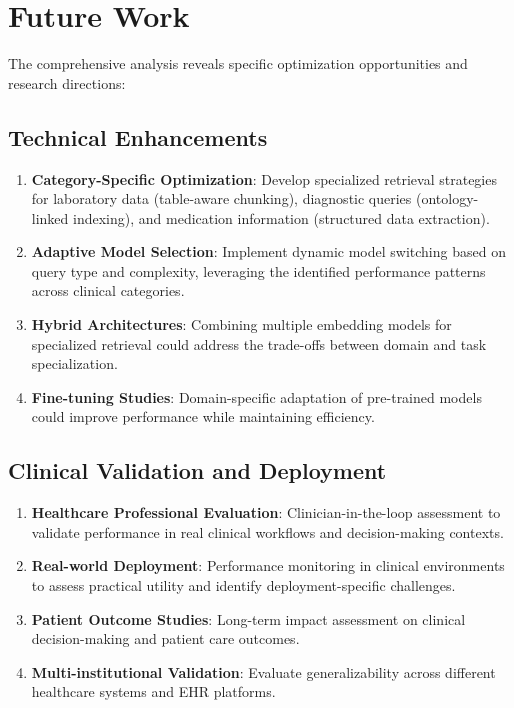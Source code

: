 \section{Future Work}

The comprehensive analysis reveals specific optimization opportunities and research directions:

\subsection{Technical Enhancements}

\begin{enumerate}
    \item \textbf{Category-Specific Optimization}: Develop specialized retrieval strategies for laboratory data (table-aware chunking), diagnostic queries (ontology-linked indexing), and medication information (structured data extraction).

    \item \textbf{Adaptive Model Selection}: Implement dynamic model switching based on query type and complexity, leveraging the identified performance patterns across clinical categories.

    \item \textbf{Hybrid Architectures}: Combining multiple embedding models for specialized retrieval could address the trade-offs between domain and task specialization.

    \item \textbf{Fine-tuning Studies}: Domain-specific adaptation of pre-trained models could improve performance while maintaining efficiency.
\end{enumerate}

\subsection{Clinical Validation and Deployment}

\begin{enumerate}
    \item \textbf{Healthcare Professional Evaluation}: Clinician-in-the-loop assessment to validate performance in real clinical workflows and decision-making contexts.

    \item \textbf{Real-world Deployment}: Performance monitoring in clinical environments to assess practical utility and identify deployment-specific challenges.

    \item \textbf{Patient Outcome Studies}: Long-term impact assessment on clinical decision-making and patient care outcomes.

    \item \textbf{Multi-institutional Validation}: Evaluate generalizability across different healthcare systems and EHR platforms.
\end{enumerate}

